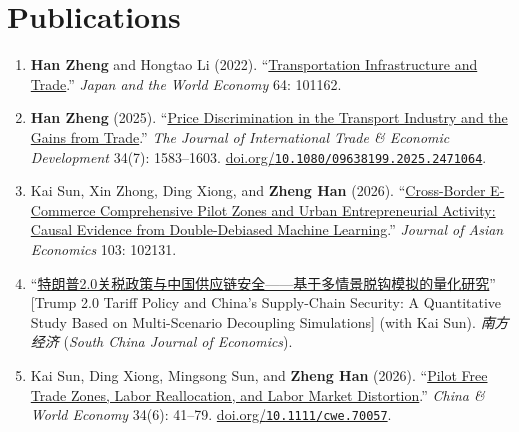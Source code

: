 \documentclass[11pt]{article}
\begin{document}
\section{Publications}
\begin{enumerate}
  \item \textbf{Han Zheng} and Hongtao Li (2022). ``\href{https://drive.google.com/file/d/1UP-O-mX7Vxigj6MEqa50DMP995JgaYMM/view?usp=share_link}{Transportation Infrastructure and Trade}.''
        \textit{Japan and the World Economy} 64: 101162.
  \item \textbf{Han Zheng} (2025). ``\href{https://www.tandfonline.com/eprint/5XQIVKBKF9Q8QZ8F77KP/full?target=10.1080/09638199.2025.2471064}{Price Discrimination in the Transport Industry and the Gains from Trade}.''
        \textit{The Journal of International Trade \& Economic Development}
        34(7): 1583--1603. \href{https://doi.org/10.1080/09638199.2025.2471064}{doi.org/\nolinkurl{10.1080/09638199.2025.2471064}}.
  \item Kai Sun, Xin Zhong, Ding Xiong, and \textbf{Zheng Han} (2026). ``\href{https://authors.elsevier.com/a/1mWCG3kX4grTax}{Cross-Border E-Commerce Comprehensive Pilot Zones and Urban Entrepreneurial Activity: Causal Evidence from Double-Debiased Machine Learning}.''
        \textit{Journal of Asian Economics} 103: 102131.
  \item ``\href{https://kns.cnki.net/kcms2/article/abstract?v=HTCMX8yYpPGgaLwDXz-ED_S9Lnkofx5o6AEXjI57umIsVANCE06um8h2HEyeOl2UvIsVivPH_FtNb2xJDrCpzglmNwAM-j3HV98TDTfZSqYKS84vLIPjI5m1dJC_R5g-78XIUG13UXmdBqGc03wz6R7djipqRIooxinEg1CNIfqziwiUAYCSqg==&uniplatform=NZKPT&language=CHS}{特朗普2.0关税政策与中国供应链安全——基于多情景脱钩模拟的量化研究}''
        [Trump 2.0 Tariff Policy and China's Supply-Chain Security: A Quantitative Study
        Based on Multi-Scenario Decoupling Simulations] (with Kai Sun). \textit{南方经济}
        (\textit{South China Journal of \mbox{Economics}}).
  \item Kai Sun, Ding Xiong, Mingsong Sun, and \textbf{Zheng Han} (2026). ``\href{https://doi.org/10.1111/cwe.70057}{Pilot Free Trade Zones, Labor Reallocation, and Labor Market Distortion}.''
        \textit{China \& World Economy} 34(6): 41--79. \href{https://doi.org/10.1111/cwe.70057}{doi.org/\nolinkurl{10.1111/cwe.70057}}.
\end{enumerate}

\end{document}
